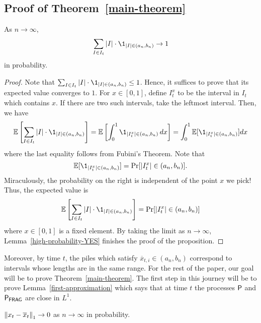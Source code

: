 \documentclass[12pt]{article}
\begin{document}
\subsection{Proof of Theorem~\ref{main-theorem}}

\begin{prop} \label{zero-approximation}
	As $n \to \infty$, 
	\[
		\sum_{I \in I_t} |I| \cdot \1_{|I| \in (a_n, b_n)} \to 1
	\]
	in probability. 
\end{prop}

\begin{proof}
	Note that $\sum_{I \in I_t} |I| \cdot \1_{|I| \in (a_n, b_n)} \leq 1$. Hence, it suffices to prove that its expected value converges to $1$. For $x \in [0, 1]$, define $I_t^x$ to be the interval in $I_t$ which contains $x$. If there are two such intervals, take the leftmost interval. Then, we have
	\[
		\EE \left [ \sum_{I \in I_t} |I| \cdot \1_{|I| \in (a_n, b_n)} \right ] = \EE \left [ \int_0^1 \1_{|I_t^x| \in (a_n, b_n)} \, dx \right ] = \int_0^1 \EE[\1_{|I_t^x| \in (a_n, b_n)} ] dx
	\]
	where the last equality follows from Fubini's Theorem. Note that 
	\[
		\EE[\1_{|I_t^x| \in (a_n, b_n)}] = \Pr[|I_t^x| \in (a_n, b_n)].
	\]
	Miraculously, the probability on the right is independent of the point $x$ we pick! Thus, the expected value is
	\[ 
		\EE \left [ \sum_{I \in I_t} |I| \cdot \1_{|I| \in (a_n, b_n)} \right ] = \Pr[|I_t^x| \in (a_n, b_n)]
	\]
	where $x \in [0, 1]$ is a fixed element. By taking the limit as $n \to \infty$, Lemma~\ref{high-probability-YES} finishes the proof of the proposition. 
\end{proof}

Moreover, by time $t$, the piles which satisfy $\overline{x}_{t, i} \in (a_n, b_n)$ correspond to intervals whose lengths are in the same range. For the rest of the paper, our goal will be to prove Theorem~\ref{main-theorem}. The first step in this journey will be to prove Lemma~\ref{first-approximation} which says that at time $t$ the processes $\mathsf{P}$ and $\mathsf{P}_{\mathsf{FRAG}}$ are close in $L^1$. 
\begin{lem} \label{first-approximation}
	$\left\lVert x_t - \overline{x}_t \right\rVert_1 \to 0$ as $n \to \infty$ in probability. 
\end{lem}
\end{document}

